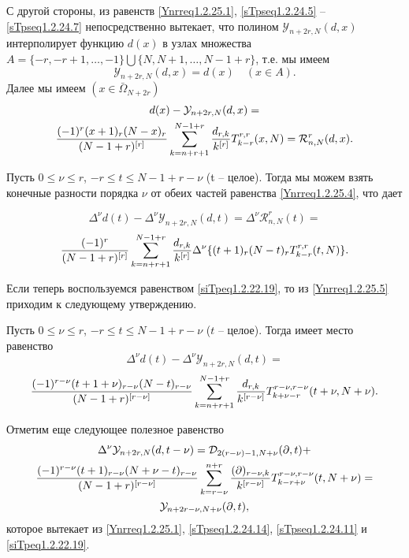 С другой стороны, из равенств \eqref{Ynrreq1.2.25.1}, \eqref{sTpseq1.2.24.5} -- \eqref{sTpseq1.2.24.7} непосредственно
вытекает, что полином $\mathcal{Y}_{n+2r,N}(d,x)$ интерполирует функцию
$d(x)$  в узлах множества $A=\{-r,-r+1,\ldots,-1\}\bigcup\{N,N+1,\ldots, N-1+r\}$, т.е.  мы  имеем
\begin{equation}\label{Ynrreq1.2.25.3}
\mathcal{Y}_{n+2r,N}(d,x)=d(x) \quad (x\in A ).
\end{equation}
Далее мы имеем
$(x\in \bar\Omega_{N+2r})$
\begin{multline}
\label{Ynrreq1.2.25.4}
d(x)-\mathcal{Y}_{n+2r,N}(d,x)=\\
{(-1)^r
(x+1)_r(N-x)_r\over (N-1+r)^{[r]}} \sum_{k=n+r+1}^{N-1+r}
{d_{r,k}\over  k^{[r]}} T_{k-r}^{r,r}(x,N)=\mathcal{R}_{n,N}^r(d,x).
\end{multline}

Пусть $0\le\nu\le r$, $-r\le t\le N-1+r-\nu$ (t -- целое). Тогда
     мы можем взять конечные разности порядка $\nu$ от обеих
     частей равенства \eqref{Ynrreq1.2.25.4}, что дает

$$
    \Delta^\nu d(t)- \Delta^\nu\mathcal{Y}_{n+2r,N}(d,t)=
\Delta^\nu\mathcal{R}_{n,N}^r(t)=
$$
\begin{equation}\label{Ynrreq1.2.25.5}
{(-1)^r\over(N-1+r)^{[r]}} \sum_{k=n+r+1}^{N-1+r}{d_{r,k}\over k^{[r]}}\Delta^\nu
\{(t+1)_r(N-t)_rT_{k-r}^{r,r}(t,N)\}.
\end{equation}




Если теперь воспользуемся равенством \eqref{siTpeq1.2.22.19}, то из \eqref{Ynrreq1.2.25.5}  приходим к следующему утверждению.
\vskip 0.5cm
\begin{theorem}\label{Yn2r:t1} Пусть $0\le\nu\le r$, $-r\le t\le N-1+r-\nu$ ($t$ -- целое). Тогда имеет место равенство
    $$
    \Delta^\nu d(t)- \Delta^\nu\mathcal{Y}_{n+2r,N}(d,t)=
    $$
    \begin{equation}\label{Ynrreq1.2.25.6}
    {(-1)^{r-\nu}(t+1+\nu)_{r-\nu}(N-t)_{r-\nu} \over(N-1+r)^{[r-\nu]}}
    \sum_{k=n+r+1}^{N-1+r}{d_{r,k}\over k^{[r-\nu]}} T_{k+\nu-r}^{r-\nu,r-\nu}(t+\nu,N+\nu).
    \end{equation}
\end{theorem}


Отметим еще следующее полезное равенство
\begin{multline}\label{Ynrreq1.2.25.7}
\Delta^\nu\mathcal{Y}_{n+2r,N}(d,t-\nu)=\mathcal{D}_{2(r-\nu)-1,N+\nu}(\partial ,t)+\\
{(-1)^{r-\nu}(t+1)_{r-\nu}(N+\nu-t)_{r-\nu}\over (N-1+r)^{[r-\nu]}}
\sum_{k=r-\nu}^{n+r} {(\partial)_{r-\nu,k}\over k^{[r-\nu]}}
T_{k-r+\nu}^{r-\nu,r-\nu}(t,N+\nu)=\\
\mathcal{Y}_{n+2r-\nu,N+\nu}(\partial,t),
\end{multline}
которое вытекает из \eqref{Ynrreq1.2.25.1}, \eqref{sTpseq1.2.24.14}, \eqref{sTpseq1.2.24.11} и \eqref{siTpeq1.2.22.19}.

